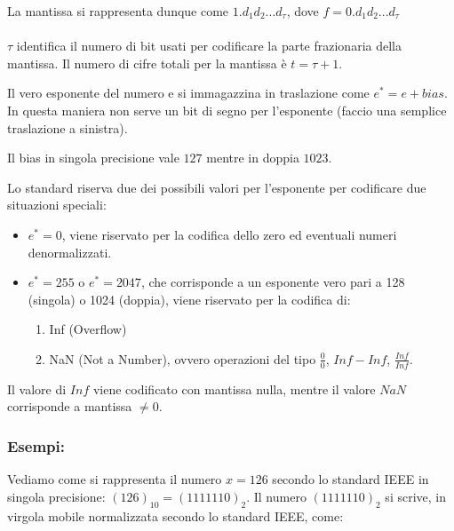 \documentclass[a4paper, 11pt]{article}
\begin{document}
        La mantissa si rappresenta dunque come $1.d_1d_2...d_{\tau}$, dove $f = 0.d_1d_2...d_{\tau}$

        \paragraph{}
        $\tau$ identifica il numero di bit usati per codificare la parte frazionaria della
        mantissa. Il numero di cifre totali per la mantissa è $t = \tau + 1$.

        Il vero esponente del numero e si immagazzina in traslazione come $e^* = e + bias$.
        In questa maniera non serve un bit di segno per l’esponente (faccio una semplice traslazione a sinistra).

        Il bias in singola precisione vale $127$ mentre in doppia $1023$.
        
        Lo standard riserva due dei possibili valori per l’esponente per codificare due situazioni speciali:

        \begin{itemize}
            \item $e^* = 0$, viene riservato per la codifica dello zero ed eventuali numeri
            denormalizzati.
            \item $e^* = 255$ o $e^*=2047$, che corrisponde a un esponente vero pari a 128 (singola) o 1024 (doppia), viene riservato per la codifica di:
            
            \begin{enumerate}
                \item Inf (Overflow)
                \item NaN (Not a Number), ovvero operazioni del tipo $\frac{0}{0}$, $Inf-Inf$, $\frac{Inf}{Inf}$.
            \end{enumerate}

        \end{itemize}

        Il valore di $Inf$ viene codificato con mantissa nulla, mentre il valore $NaN$ corrisponde a mantissa $\neq 0$.

        \subsubsection*{Esempi: }
        
        Vediamo come si rappresenta il numero \( x = 126 \) secondo lo standard IEEE in singola precisione:
        \((126)_{10} = (1111110)_{2}\).
        Il numero \((1111110)_{2}\) si scrive, in virgola mobile normalizzata secondo lo standard IEEE, come:
            
\end{document}
